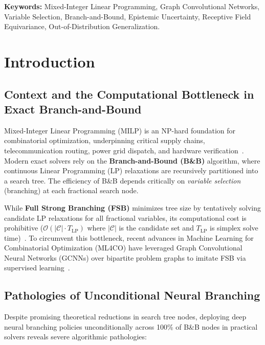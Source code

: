 \documentclass[10pt,twocolumn,letterpaper]{article}
\theoremstyle{plain}
\theoremstyle{definition}
\theoremstyle{remark}
\begin{document}
\vspace{0.5em}
\noindent \textbf{Keywords:} Mixed-Integer Linear Programming, Graph Convolutional Networks, Variable Selection, Branch-and-Bound, Epistemic Uncertainty, Receptive Field Equivariance, Out-of-Distribution Generalization.

\section{Introduction}
\label{sec:intro}

\subsection{Context and the Computational Bottleneck in Exact Branch-and-Bound}
Mixed-Integer Linear Programming (MILP) is an NP-hard foundation for combinatorial optimization, underpinning critical supply chains, telecommunication routing, power grid dispatch, and hardware verification~\cite{achterberg2005branching,gamrath2020scip}. Modern exact solvers rely on the \textbf{Branch-and-Bound (B\&B)} algorithm, where continuous Linear Programming (LP) relaxations are recursively partitioned into a search tree. The efficiency of B\&B depends critically on \textit{variable selection} (branching) at each fractional search node.

While \textbf{Full Strong Branching (FSB)} minimizes tree size by tentatively solving candidate LP relaxations for all fractional variables, its computational cost is prohibitive ($\mathcal{O}(|\mathcal{C}| \cdot T_{\text{LP}})$ where $|\mathcal{C}|$ is the candidate set and $T_{\text{LP}}$ is simplex solve time)~\cite{achterberg2005branching}. To circumvent this bottleneck, recent advances in Machine Learning for Combinatorial Optimization (ML4CO) have leveraged Graph Convolutional Neural Networks (GCNNs) over bipartite problem graphs to imitate FSB via supervised learning~\cite{gasse2019exact,prouvost2020ecole,nair2020solving}.

\subsection{Pathologies of Unconditional Neural Branching}
Despite promising theoretical reductions in search tree nodes, deploying deep neural branching policies unconditionally across 100\% of B\&B nodes in practical solvers reveals severe algorithmic pathologies:
\end{document}
